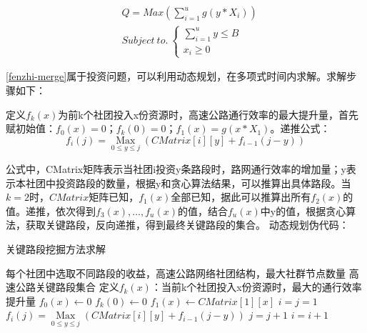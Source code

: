				\begin{align}
				 &Q=Max(\sum\limits_{i = 1}^u {g({y}*{X_i})})   \label{fenzhi-merge} \\
				 &Subject \  to. \  \left\{ {\begin{array}{*{20}{c}}
					  {\sum\limits_{i = 1}^u {{y}}  \leqslant B} \\ 
					  {{x_i} \geqslant 0} 
				\end{array}} \right.
				\end{align}

				\ref{fenzhi-merge}属于投资问题，可以利用动态规划，在多项式时间内求解。求解步骤如下：

				定义$f_k (x)$为前k个社团投入x份资源时，高速公路通行效率的最大提升量，首先赋初始值：$f_0(x)=0$；$f_k(0)=0$；$f_1(x)=g(x*X_{1})$。递推公式：
					$$f_i (j)=\mathop {{\text{Max}}}\limits_{0 \leqslant y \leqslant j} (CMatrix[i][y]+f_{i-1} (j-y))$$

				公式中，CMatrix矩阵表示当社团i投资y条路段时，路网通行效率的增加量；y表示本社团中投资路段的数量，根据y和贪心算法结果，可以推算出具体路段。当$k=2$时，$CMatrix$矩阵已知，$f_1(x)$全部已知，据此可以推算出所有$f_2(x)$的值。递推，依次得到$f_3(x),\dots,f_u(x)$的值，结合$f_u(x)$中y的值，根据贪心算法，获取关键路段，反向递推，得到最终关键路段的集合。
				动态规划伪代码：

				\begin{algorithm}[h]
		        \caption{关键路段挖掘方法求解}  
		        \label{touzi}
		        \begin{algorithmic}[1] %
		            \Require 每个社团中选取不同路段的收益，高速公路网络社团结构，最大社群节点数量
		            \Ensure 高速公路关键路段集合
		                \State 定义$f_k (x)$：当前k个社团投入x份资源时，最大的通行效率提升量
		                \State $f_0 (x)\gets 0$
		                \State $f_k (0)\gets 0$
		                \State $f_1 (x)\gets CMatrix[1][x]$
		                \State $i=j=1$
		                		\State $f_i (j)=\mathop {{\text{Max}}}\limits_{0 \leqslant y \leqslant j} (CMatrix[i][y]+f_{i-1} (j-y))$
		                		\State $j=j+1$
		                	\EndWhile
		                	\State $i=i+1$
		                \EndWhile  
		                \State {}  
		            \EndFunction  
		        \end{algorithmic}  
		    	\end{algorithm} 

